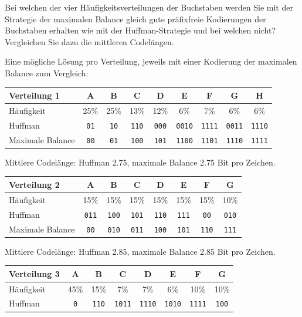 \begin{myexercise}
	Bei welchen der vier Häufigkeitsverteilungen der Buchstaben werden Sie mit der Strategie
	der maximalen Balance gleich gute präfixfreie Kodierungen der Buchstaben erhalten wie mit der Huffman-Strategie und bei welchen nicht?
	Vergleichen Sie dazu die mittleren Codelängen.
	\begin{myanswer}
		Eine mögliche Lösung pro Verteilung, jeweils mit einer Kodierung der maximalen Balance zum Vergleich:
		\begin{center}
			\small
			\begin{tabular}{lcccccccc}
				\textbf{Verteilung 1} & A & B & C & D & E & F & G & H \\\midrule
				Häufigkeit & 25\% & 25\% & 13\% & 12\% & 6\% & 7\% & 6\% & 6\% \\
				Huffman & \texttt{01} & \texttt{10} & \texttt{110} & \texttt{000} & \texttt{0010} & \texttt{1111} & \texttt{0011} & \texttt{1110} \\
				Maximale Balance & \texttt{00} & \texttt{01} & \texttt{100} & \texttt{101} & \texttt{1100} & \texttt{1101} & \texttt{1110} & \texttt{1111}
			\end{tabular}
		\end{center}
		Mittlere Codelänge: Huffman 2.75, maximale Balance 2.75 Bit pro Zeichen.
		\begin{center}
			\small
			\begin{tabular}{lccccccc}
				\textbf{Verteilung 2} & A & B & C & D & E & F & G \\\midrule
				Häufigkeit & 15\% & 15\% & 15\% & 15\% & 15\% & 15\% & 10\% \\
				Huffman & \texttt{011} & \texttt{100} & \texttt{101} & \texttt{110} & \texttt{111} & \texttt{00} & \texttt{010} \\
				Maximale Balance & \texttt{00} & \texttt{010} & \texttt{011} & \texttt{100} & \texttt{101} & \texttt{110} & \texttt{111}
			\end{tabular}
		\end{center}
		Mittlere Codelänge: Huffman 2.85, maximale Balance 2.85 Bit pro Zeichen.
		\begin{center}
			\small
			\begin{tabular}{lccccccc}
				\textbf{Verteilung 3} & A & B & C & D & E & F & G \\\midrule
				Häufigkeit & 45\% & 15\% & 7\% & 7\% & 6\% & 10\% & 10\% \\
				Huffman & \texttt{0} & \texttt{110} & \texttt{1011} & \texttt{1110} & \texttt{1010} & \texttt{1111} & \texttt{100} \\

\end{tabular}
\end{center}
\end{myanswer}
\end{myexercise}
